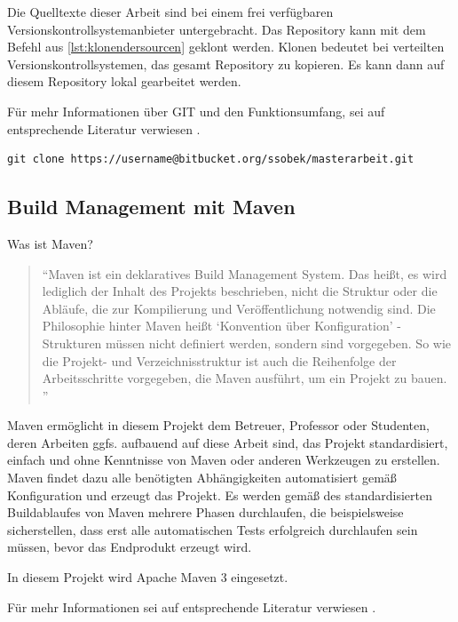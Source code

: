 Die Quelltexte dieser Arbeit sind bei einem frei verfügbaren Versionskontrollsystemanbieter untergebracht. Das Repository kann mit dem Befehl aus \autoref{lst:klonendersourcen} geklont werden. Klonen bedeutet bei verteilten Versionskontrollsystemen, das gesamt Repository zu kopieren. Es kann dann auf diesem Repository lokal gearbeitet werden. 

Für mehr Informationen über GIT und den Funktionsumfang, sei auf entsprechende Literatur verwiesen \citep[vgl.][]{pragGit}.

 \begin{lstlisting}[caption=Klonen der Sourcen, language=XML, label=lst:klonendersourcen]
git clone https://username@bitbucket.org/ssobek/masterarbeit.git
 \end{lstlisting}   

\subsection{Build Management mit Maven}

Was ist Maven?

\begin{quotation}
\enquote{Maven ist ein deklaratives Build Management System. Das heißt, es wird lediglich der Inhalt des Projekts beschrieben, nicht die Struktur oder die Abläufe, die zur Kompilierung und Veröffentlichung notwendig sind. Die Philosophie hinter Maven heißt \enquote{Konvention über Konfiguration} - Strukturen müssen nicht definiert werden, sondern sind vorgegeben. So wie die Projekt- und Verzeichnisstruktur ist auch die Reihenfolge der Arbeitsschritte vorgegeben, die Maven ausführt, um ein Projekt zu bauen. \citep[S. 27][]{Mitp-Verlag}}	
\end{quotation}

Maven ermöglicht in diesem Projekt dem Betreuer, Professor oder Studenten, deren Arbeiten ggfs. aufbauend auf diese Arbeit sind, das Projekt standardisiert, einfach und ohne Kenntnisse von Maven oder anderen Werkzeugen zu erstellen. Maven findet dazu alle benötigten Abhängigkeiten automatisiert gemäß Konfiguration und erzeugt das Projekt. Es werden gemäß des standardisierten Buildablaufes von Maven mehrere Phasen durchlaufen, die beispielsweise sicherstellen, dass erst alle automatischen Tests erfolgreich durchlaufen sein müssen, bevor das Endprodukt erzeugt wird. 

In diesem Projekt wird Apache Maven 3 eingesetzt. 

Für mehr Informationen sei auf entsprechende Literatur verwiesen \citep[vgl.][]{Mitp-Verlag}.

